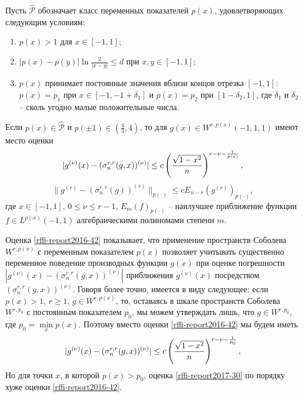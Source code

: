 Пусть $\mathcal{\hat P}$ обозначает класс переменных показателей $p(x)$, удовлетворяющих следующим условиям:
\begin{enumerate}[1)]
\item\label{rffi-report2017-p-cond-1}
$p(x)>1$ для $x\in[-1,1]$;
\item\label{rffi-report2017-p-cond-2}
$|p(x)-p(y)|\ln\frac{2}{|x-y|}\le d$ при $x,y\in[-1,1]$;
\item\label{rffi-report2017-p-cond-3}
$p(x)$  принимает постоянные значения вблизи концов отрезка $[-1,1]$: $p(x)=p_1$ при $x\in[-1,-1+\delta_1]$ и $p(x)=p_2$ при $[1-\delta_2, 1]$, где $\delta_1$ и $\delta_2$ -- сколь угодно малые положительные числа.
\end{enumerate}
\begin{theorem}\label{rffi-report2016-th5}
Если $p(x)\in \mathcal{\hat P}$ и $p(\pm1)\in (\frac43,4)$, то для $g(x)\in W^{r,p(x)}(-1,1,1)$ имеют место оценки
\begin{equation}\label{rffi-report2016-42}
|g^{(\nu)}(x)-(\sigma_n^{r,r}(g,x))^{(\nu)}|\le c\left({\sqrt{1-x^2}\over n}\right)^{r-\nu-\frac{1}{p(x)}} ,
\end{equation}
\begin{equation}\label{rffi-report2017-29}
\|g^{(r)}-(\sigma_n^{r,r}(g))^{(r)}\|_{p(\cdot)}\le cE_{n-r}(g^{(r)})_{p(\cdot)},
\end{equation}
где $ x\in[-1,1]$, $0\le\nu\le r-1$, $E_m(f)_{p(\cdot)}$ -- наилучшее приближение функции $f\in L^{p(x)}(-1,1) $ алгебраическими полиномами степени $m$.
\end{theorem}


Оценка \eqref{rffi-report2016-42} показывает, что применение пространств Соболева  $W^{r,p(x)}$ с переменным показателем $p(x)$ позволяет учитывать существенно переменное поведение производных функции  $g(x)$  при оценке погрешности $|g^{(\nu)}(x)-(\sigma_n^{r,r}(g,x))^{(\nu)}|$ приближения  $g^{(\nu)}(x)$ посредством \linebreak $(\sigma_n^{r,r}(g,x))^{(\nu)}$. Говоря более точно, имеется в виду следующее: если $p(x)>1$, $r\ge1$, $g\in W^{r,p(x)}$, то, оставаясь в шкале пространств Соболева $W^{r,p_0}$ с постоянным показателем $p_0$, мы можем утверждать лишь, что  $g\in W^{r,p_0}$, где $p_0=\min\limits_x p(x)$. Поэтому вместо оценки \eqref{rffi-report2016-42} мы будем иметь
\begin{equation}\label{rffi-report2017-30}
|g^{(\nu)}(x)-(\sigma_n^{r,r}(g,x))^{(\nu)}|\le c\left({\sqrt{1-x^2}\over n}\right)^{r-\nu-\frac{1}{p_0}} ,
\end{equation}
Но для точки $x$, в которой $p(x)>p_0$, оценка \eqref{rffi-report2017-30}  по порядку хуже оценки \eqref{rffi-report2016-42}.

